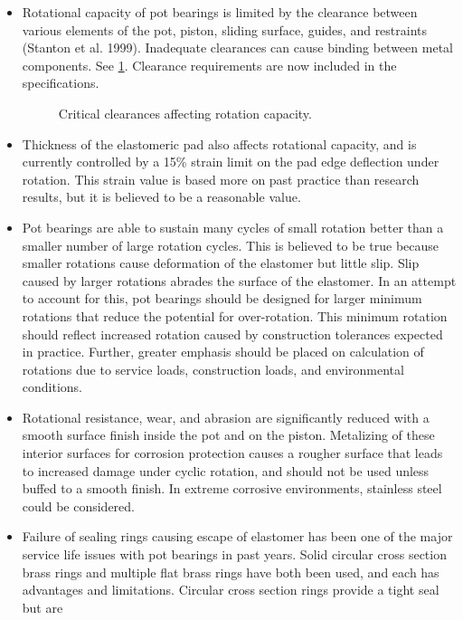 \begin{itemize}
  \item Rotational capacity of pot bearings is limited by the clearance between various elements of the pot, piston,
  sliding surface, guides, and restraints (Stanton et al. 1999). Inadequate clearances can cause binding between
  metal components. See \cref{fig:critical-clearances}. Clearance requirements are now included in the specifications.
  
  \begin{figure}
    \caption{Critical clearances affecting rotation capacity.}\label{fig:critical-clearances}
  \end{figure}
  \item Thickness of the elastomeric pad also affects rotational capacity, and is currently controlled by a 15\% strain
  limit on the pad edge deflection under rotation. This strain value is based more on past practice than research
  results, but it is believed to be a reasonable value.
  \item Pot bearings are able to sustain many cycles of small rotation better than a smaller number of large rotation
  cycles. This is believed to be true because smaller rotations cause deformation of the elastomer but little slip.
  Slip caused by larger rotations abrades the surface of the elastomer. In an attempt to account for this, pot
  bearings should be designed for larger minimum rotations that reduce the potential for over-rotation. This
  minimum rotation should reflect increased rotation caused by construction tolerances expected in practice.
  Further, greater emphasis should be placed on calculation of rotations due to service loads, construction
  loads, and environmental conditions.
  \item Rotational resistance, wear, and abrasion are significantly reduced with a smooth surface finish inside the pot
  and on the piston. Metalizing of these interior surfaces for corrosion protection causes a rougher surface that
  leads to increased damage under cyclic rotation, and should not be used unless buffed to a smooth finish. In
  extreme corrosive environments, stainless steel could be considered.
  \item Failure of sealing rings causing escape of elastomer has been one of the major service life issues with pot
  bearings in past years. Solid circular cross section brass rings and multiple flat brass rings have both been
  used, and each has advantages and limitations. Circular cross section rings provide a tight seal but are

\end{itemize}
